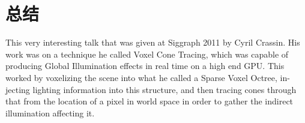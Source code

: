 \section{总结}
This very interesting talk that was given at Siggraph 2011 by Cyril Crassin. His work was on a technique he called Voxel Cone Tracing, which was capable of producing Global Illumination effects in real time on a high end GPU. This worked by voxelizing the scene into what he called a Sparse Voxel Octree, in- jecting lighting information into this structure, and then tracing cones through that from the location of a pixel in world space in order to gather the indirect illumination affecting it.






























































